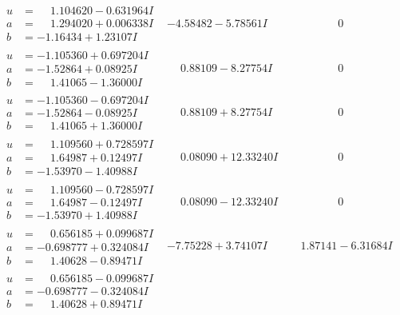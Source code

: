 \documentclass[1p]{elsarticle_modified}
\theoremstyle{definition}
\begin{document}
$$\begin{array}{c|c|c}
\begin{aligned}
u &= \phantom{-}1.104620 - 0.631964 I \\
a &= \phantom{-}1.294020 + 0.006338 I \\
b &= -1.16434 + 1.23107 I\end{aligned}
 & -4.58482 - 5.78561 I & \phantom{-0.000000 } 0 \\ \hline\begin{aligned}
u &= -1.105360 + 0.697204 I \\
a &= -1.52864 + 0.08925 I \\
b &= \phantom{-}1.41065 - 1.36000 I\end{aligned}
 & \phantom{-}0.88109 - 8.27754 I & \phantom{-0.000000 } 0 \\ \hline\begin{aligned}
u &= -1.105360 - 0.697204 I \\
a &= -1.52864 - 0.08925 I \\
b &= \phantom{-}1.41065 + 1.36000 I\end{aligned}
 & \phantom{-}0.88109 + 8.27754 I & \phantom{-0.000000 } 0 \\ \hline\begin{aligned}
u &= \phantom{-}1.109560 + 0.728597 I \\
a &= \phantom{-}1.64987 + 0.12497 I \\
b &= -1.53970 - 1.40988 I\end{aligned}
 & \phantom{-}0.08090 + 12.33240 I & \phantom{-0.000000 } 0 \\ \hline\begin{aligned}
u &= \phantom{-}1.109560 - 0.728597 I \\
a &= \phantom{-}1.64987 - 0.12497 I \\
b &= -1.53970 + 1.40988 I\end{aligned}
 & \phantom{-}0.08090 - 12.33240 I & \phantom{-0.000000 } 0 \\ \hline\begin{aligned}
u &= \phantom{-}0.656185 + 0.099687 I \\
a &= -0.698777 + 0.324084 I \\
b &= \phantom{-}1.40628 - 0.89471 I\end{aligned}
 & -7.75228 + 3.74107 I & \phantom{-}1.87141 - 6.31684 I \\ \hline\begin{aligned}
u &= \phantom{-}0.656185 - 0.099687 I \\
a &= -0.698777 - 0.324084 I \\
b &= \phantom{-}1.40628 + 0.89471 I\end{aligned}

\end{array}$$
\end{document}
